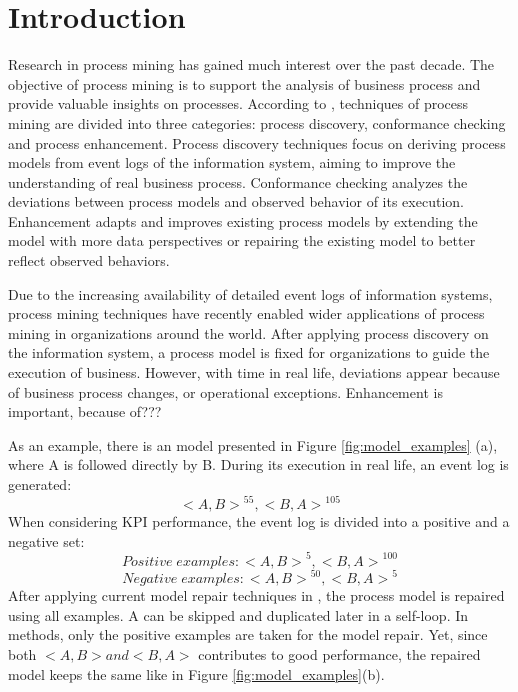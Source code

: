 \documentclass[]{article}
\begin{document}
\section{Introduction}
Research in process mining has gained much interest over the past decade\cite{van2011process,ghasemi2016process}. The objective of process mining is to support the analysis of business process and provide valuable insights on processes. According to \cite{van2011process}, techniques of process mining are divided into three categories: process discovery, conformance checking and process enhancement. Process discovery techniques focus on deriving process models from event logs of the information system, aiming to improve the understanding of real business process. Conformance checking analyzes the deviations between process models and observed behavior of its execution. Enhancement adapts and improves existing process models by extending the model with more data perspectives or repairing the existing model to better reflect observed behaviors. 

Due to the increasing availability of detailed event logs of information systems, process mining techniques have recently enabled wider applications of process mining in organizations around the world\cite{van2011process}. After applying process discovery  on the information system, a process model is fixed for organizations to guide the execution of business. However, with time in real life, deviations appear because of business process changes, or operational exceptions. Enhancement is important, because of??? 

As an example, there is an model presented in Figure \ref{fig:model_examples} (a), where A is followed directly by B. During its execution in real life, an event log is generated: 
\[{ <A, B> }^{55}  , {<B, A>}^{105} \] 
When considering KPI performance, the event log is divided into a positive and a negative set: 
\[ Positive \;  examples: { <A, B> }^{5}  , {<B, A>}^{100} \] 
\[ Negative \; examples: { <A, B> }^{50}  , {<B, A>}^{5} \]  
After applying current model repair techniques in \cite{Fahland}, the process model is repaired using all examples. A can be skipped and duplicated later in a self-loop. In \cite{Dees}\cite{Anja} methods, only the positive examples are taken for the model repair. Yet, since both $<A,B> and <B,A>$ contributes to good performance,  the repaired model keeps the same like in Figure \ref{fig:model_examples}(b).
\end{document}
